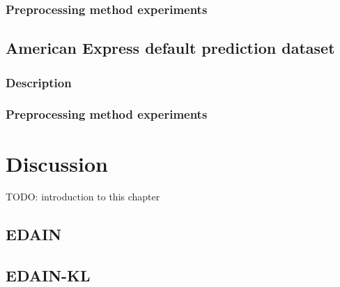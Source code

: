 \documentclass{statsmsc}
\begin{document}

\subsection{Preprocessing method experiments}%
\label{sub:Preprocessing method experiments}




\section{American Express default prediction dataset}%
\label{sec:American Express default prediction dataset}%

\subsection{Description}%
\label{sub:Description}


\subsection{Preprocessing method experiments}%
\label{sub:Preprocessing method experiments}




\chapter{Discussion} %

TODO: introduction to this chapter

\section{EDAIN}%
\label{sec:EDAIN}


\section{EDAIN-KL}%
\label{sec:EDAIN-KL}
\end{document}
